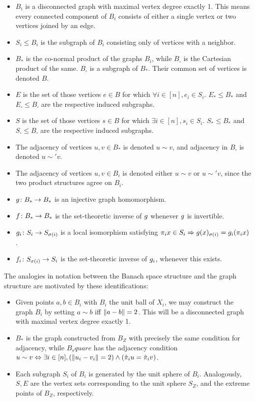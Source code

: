 \documentclass{amsart}
\theoremstyle{definition}
\begin{document}
\begin{itemize}
    \item $B_i$ is a disconnected graph with maximal vertex degree exactly 1. This means every connected component of $B_i$ consists of either a single vertex or two vertices joined by an edge.
    \item $S_i \leq B_i$ is the subgraph of $B_i$ consisting only of vertices with a neighbor.
    \item $B_*$ is the co-normal product of the graphs $B_i$, while $B_\square$ is the Cartesian product of the same. $B_\square$ is a subgraph of $B_*$. Their common set of vertices is denoted $B$.
    \item $E$ is the set of those vertices $e \in B$ for which $\forall i \in [n], e_i \in S_i$. $E_* \leq B_*$ and $E_\square \leq B_\square$ are the respective induced subgraphs.
    \item $S$ is the set of those vertices $s \in B$ for which $\exists i \in [n], s_i \in S_i$. $S_* \leq B_*$ and $S_\square \leq B_\square$ are the respective induced subgraphs.
    \item The adjacency of vertices $u,v \in B_*$ is denoted $u \sim v$, and adjacency in $B_\square$ is denoted $u \sim' v$.
    \item The adjacency of vertices $u,v \in B_i$ is denoted either $u \sim v$ or $u \sim' v$, since the two product structures agree on $B_i$.
    \item $g  \colon  B_* \to B_*$ is an injective graph homomorphism.
    \item $f  \colon  B_* \to B_*$ is the set-theoretic inverse of $g$ whenever $g$ is invertible.
    \item $g_i  \colon  S_i \to S_{\sigma(i)}$ is a local isomorphism satisfying $\pi_i x \in S_i \Rightarrow g(x)_{\sigma(i)} = g_i (\pi_i x)$.
    \item $f_i  \colon  S_{\sigma(i)} \to S_i$ is the set-theoretic inverse of $g_i$, whenever this exists.
\end{itemize}

The analogies in notation between the Banach space structure and the graph structure are motivated by these identifications:

\begin{itemize}
    \item Given points $a,b \in B_i$ with $B_i$ the unit ball of $X_i$, we may construct the graph $B_i$ by setting $a \sim b$ iff $\norm{a-b} = 2$. This will be a disconnected graph with maximal vertex degree exactly 1.
    \item $B_*$ is the graph constructed from $B_Z$ with precisely the same condition for adjacency, while $B_square$ has the adjacency condition $u \sim v \Leftrightarrow \exists i \in [n], (\norm{u_i - v_i} = 2) \land (\hat{\pi}_i u = \hat{\pi}_i v)$.
    \item Each subgraph $S_i$ of $B_i$ is generated by the unit sphere of $B_i$. Analogously, $S,E$ are the vertex sets corresponding to the unit sphere $S_Z$, and the extreme points of $B_Z$, respectively.
\end{itemize}
\end{document}
